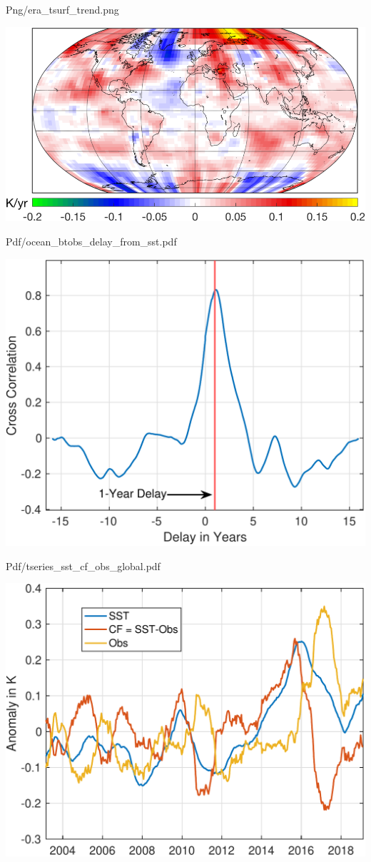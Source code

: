 \documentclass[presentation]{beamer}
\begin{document}
\begin{frame}[label={sec:org3b8b993}]{Png/era\_tsurf\_trend.png}
\begin{center}
\includegraphics[width=0.7\linewidth]{./Figs/Png/era_tsurf_trend.png}
\end{center}
\end{frame}

\begin{frame}[label={sec:orgc766e8d}]{Pdf/ocean\_btobs\_delay\_from\_sst.pdf}
\begin{center}
\includegraphics[width=0.7\linewidth]{./Figs/Pdf/ocean_btobs_delay_from_sst.pdf}
\end{center}
\end{frame}

\begin{frame}[label={sec:org21e05a4}]{Pdf/tseries\_sst\_cf\_obs\_global.pdf}
\begin{center}
\includegraphics[width=0.7\linewidth]{./Figs/Pdf/tseries_sst_cf_obs_global.pdf}
\end{center}
\end{frame}
\end{document}
